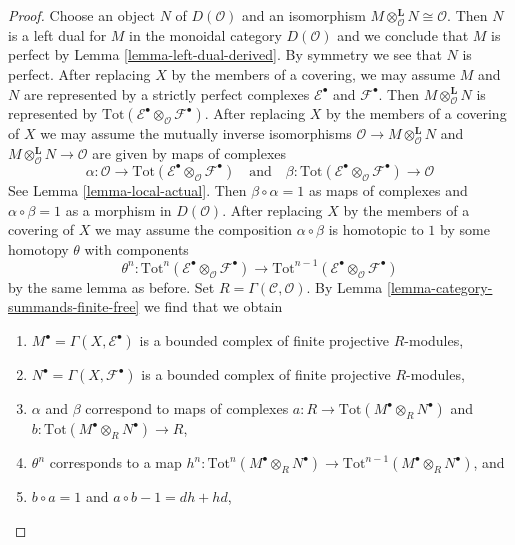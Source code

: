 \begin{proof}
\medskip\noindent
Choose an object $N$ of $D(\mathcal{O})$ and an isomorphism
$M \otimes_\mathcal{O}^\mathbf{L} N \cong \mathcal{O}$.
Then $N$ is a left dual for $M$ in the monoidal category
$D(\mathcal{O})$ and we conclude that $M$ is perfect by
Lemma \ref{lemma-left-dual-derived}. By symmetry we see that
$N$ is perfect. After replacing $X$ by the members of a covering,
we may assume $M$ and $N$ are represented by a strictly perfect
complexes $\mathcal{E}^\bullet$ and $\mathcal{F}^\bullet$.
Then $M \otimes_\mathcal{O}^\mathbf{L} N$ is represented by
$\text{Tot}(\mathcal{E}^\bullet \otimes_\mathcal{O} \mathcal{F}^\bullet)$.
After replacing $X$ by the members of a covering of $X$
we may assume the mutually inverse isomorphisms
$\mathcal{O} \to M \otimes_\mathcal{O}^\mathbf{L} N$ and
$M \otimes_\mathcal{O}^\mathbf{L} N \to \mathcal{O}$
are given by maps of complexes
$$
\alpha : \mathcal{O} \to
\text{Tot}(\mathcal{E}^\bullet \otimes_\mathcal{O} \mathcal{F}^\bullet)
\quad\text{and}\quad
\beta :
\text{Tot}(\mathcal{E}^\bullet \otimes_\mathcal{O} \mathcal{F}^\bullet)
\to \mathcal{O}
$$
See Lemma \ref{lemma-local-actual}. Then $\beta \circ \alpha = 1$
as maps of complexes and $\alpha \circ \beta = 1$ as a morphism
in $D(\mathcal{O})$. After replacing $X$ by the members of a covering
of $X$ we may assume the composition $\alpha \circ \beta$ is homotopic to $1$
by some homotopy $\theta$ with components
$$
\theta^n :
\text{Tot}^n(\mathcal{E}^\bullet \otimes_\mathcal{O} \mathcal{F}^\bullet)
\to
\text{Tot}^{n - 1}(
\mathcal{E}^\bullet \otimes_\mathcal{O} \mathcal{F}^\bullet)
$$
by the same lemma as before. Set $R = \Gamma(\mathcal{C}, \mathcal{O})$. By
Lemma \ref{lemma-category-summands-finite-free}
we find that we obtain
\begin{enumerate}
\item $M^\bullet = \Gamma(X, \mathcal{E}^\bullet)$
is a bounded complex of finite projective $R$-modules,
\item $N^\bullet = \Gamma(X, \mathcal{F}^\bullet)$
is a bounded complex of finite projective $R$-modules,
\item $\alpha$ and $\beta$ correspond to maps of complexes
$a : R \to \text{Tot}(M^\bullet \otimes_R N^\bullet)$ and
$b : \text{Tot}(M^\bullet \otimes_R N^\bullet) \to R$,
\item $\theta^n$ corresponds to a map
$h^n : \text{Tot}^n(M^\bullet \otimes_R N^\bullet) \to
\text{Tot}^{n - 1}(M^\bullet \otimes_R N^\bullet)$, and
\item $b \circ a = 1$ and $a \circ b - 1 = dh + hd$,
\end{enumerate}

\end{proof}
